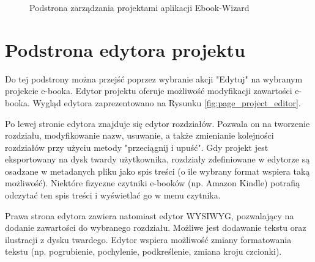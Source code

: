 \begin{figure}[h]
    \centering
    \setlength{\fboxsep}{0pt}
    \setlength{\fboxrule}{0.4pt}
    \caption{Podstrona zarządzania projektami aplikacji Ebook-Wizard}
    \label{fig:page_project_management}
\end{figure}

\section{Podstrona edytora projektu}

Do tej podstrony można przejść poprzez wybranie akcji "Edytuj" na wybranym projekcie e-booka. Edytor projektu oferuje możliwość modyfikacji zawartości e-booka. Wygląd edytora zaprezentowano na Rysunku \ref{fig:page_project_editor}.

Po lewej stronie edytora znajduje się edytor rozdziałów. Pozwala on na tworzenie rozdziału, modyfikowanie nazw, usuwanie, a także zmienianie kolejności rozdziałów przy użyciu metody "przeciągnij i upuść". Gdy projekt jest eksportowany na dysk twardy użytkownika, rozdziały zdefiniowane w edytorze są osadzane w metadanych pliku jako spis treści (o ile wybrany format wspiera taką możliwość). Niektóre fizyczne czytniki e-booków (np. Amazon Kindle) potrafią odczytać ten spis treści i wyświetlać go w menu czytnika.

Prawa strona edytora zawiera natomiast edytor WYSIWYG, pozwalający na dodanie zawartości do wybranego rozdziału. Możliwe jest dodawanie tekstu oraz ilustracji z dysku twardego. Edytor wspiera możliwość zmiany formatowania tekstu (np. pogrubienie, pochylenie, podkreślenie, zmiana kroju czcionki).

